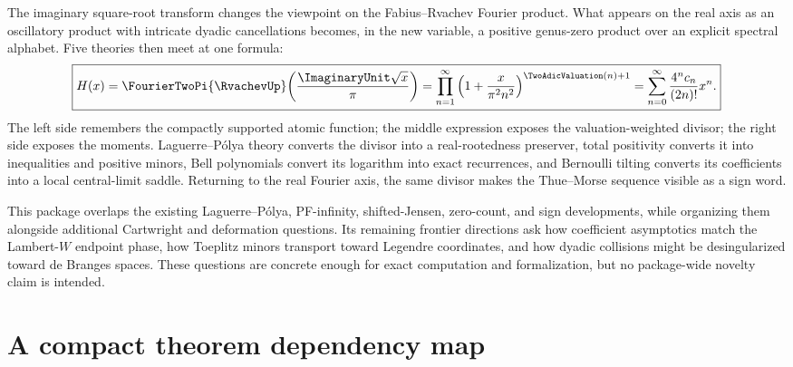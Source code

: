\documentclass[11pt]{article}
\numberwithin{equation}{section}
\theoremstyle{definition}
\theoremstyle{remark}
\begin{document}
The imaginary square-root transform changes the viewpoint on the Fabius--Rvachev Fourier product.  What appears on the real axis as an oscillatory product with intricate dyadic cancellations becomes, in the new variable, a positive genus-zero product over an explicit spectral alphabet.  Five theories then meet at one formula:
\[
 \boxed{
 H(x)=\FourierTwoPi{\RvachevUp}\!\left(\frac{\ImaginaryUnit\sqrt{x}}{\pi}\right)
 =\prod_{n=1}^{\infty}
  \left(1+\frac{x}{\pi^2n^2}\right)^{\TwoAdicValuation(n)+1}
 =\sum_{n=0}^{\infty}\frac{4^nc_n}{(2n)!}x^n.}
\]
The left side remembers the compactly supported atomic function; the middle expression exposes the valuation-weighted divisor; the right side exposes the moments.  Laguerre--Pólya theory converts the divisor into a real-rootedness preserver, total positivity converts it into inequalities and positive minors, Bell polynomials convert its logarithm into exact recurrences, and Bernoulli tilting converts its coefficients into a local central-limit saddle.  Returning to the real Fourier axis, the same divisor makes the Thue--Morse sequence visible as a sign word.

This package overlaps the existing Laguerre--P\'olya, PF-infinity, shifted-Jensen, zero-count, and sign developments, while organizing them alongside additional Cartwright and deformation questions.  Its remaining frontier directions ask how coefficient asymptotics match the Lambert-$W$ endpoint phase, how Toeplitz minors transport toward Legendre coordinates, and how dyadic collisions might be desingularized toward de Branges spaces.  These questions are concrete enough for exact computation and formalization, but no package-wide novelty claim is intended.

\appendix
\section{A compact theorem dependency map}
\end{document}
